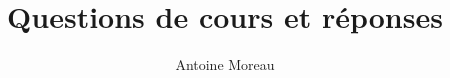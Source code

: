 \documentclass[a4paper,10pt]{article}
\title{Questions de cours et r\'eponses}
\author{Antoine Moreau}
\begin{document}
\maketitle

\begin{abstract}

\end{abstract}

%





\end{document}
